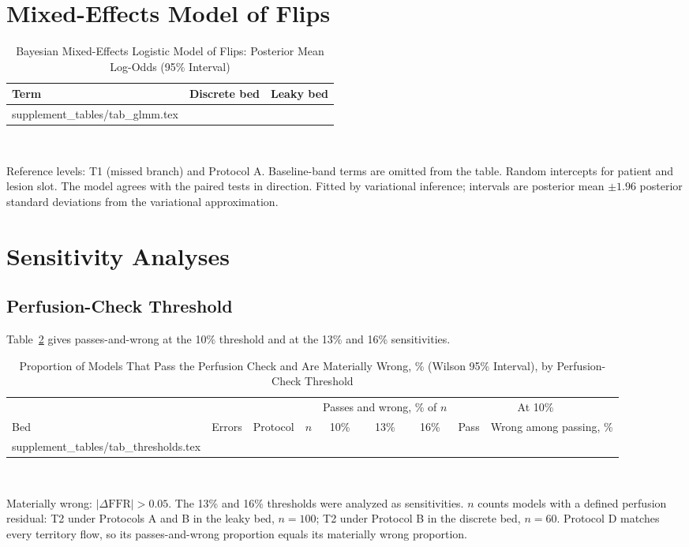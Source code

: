 \documentclass[journal,twoside,web,onecolumn]{ieeecolor}
\begin{document}
\FloatBarrier
{}
\section{Mixed-Effects Model of Flips}
\begin{table}[!ht]
\caption{Bayesian Mixed-Effects Logistic Model of Flips: Posterior Mean Log-Odds (95\% Interval)}\label{tab:glmm}
\centering\footnotesize
\begin{tabular}{@{}lcc@{}}
\toprule
Term & Discrete bed & Leaky bed\\
\midrule
{} supplement_tables/tab_glmm.tex 
\bottomrule
\end{tabular}
\\[3pt]
\parbox{0.85\textwidth}{\footnotesize Reference levels: T1 (missed branch) and Protocol A. Baseline-band terms are
omitted from the table. Random intercepts for patient and lesion slot. The model agrees with the paired tests in direction. Fitted by variational inference; intervals are
posterior mean $\pm 1.96$ posterior standard deviations from the variational approximation.}
\end{table}

\FloatBarrier
{}
\section{Sensitivity Analyses}
\subsection{Perfusion-Check Threshold}
Table~\ref{tab:thr} gives passes-and-wrong at the 10\% threshold and at the 13\% and 16\% sensitivities.
\begin{table}[!ht]
\caption{Proportion of Models That Pass the Perfusion Check and Are Materially Wrong, \% (Wilson 95\% Interval), by
Perfusion-Check Threshold}\label{tab:thr}
\centering\footnotesize
\begin{tabular}{@{}lllrcccrc@{}}
\toprule
 & & & & \multicolumn{3}{c}{Passes and wrong, \% of $n$} & \multicolumn{2}{c}{At 10\%}\\
\cmidrule(lr){5-7}\cmidrule(l){8-9}
Bed & Errors & Protocol & $n$ & 10\% & 13\% & 16\% & Pass & Wrong among passing, \%\\
\midrule
{} supplement_tables/tab_thresholds.tex 
\bottomrule
\end{tabular}
\\[3pt]
\parbox{0.85\textwidth}{\footnotesize Materially wrong: $|\Delta\mathrm{FFR}| > 0.05$. The 13\% and 16\% thresholds were analyzed as sensitivities. $n$ counts models with a
defined perfusion residual: T2 under Protocols A and B in the leaky bed, $n = 100$; T2 under Protocol B in the
discrete bed, $n = 60$. Protocol D matches every territory flow, so its passes-and-wrong proportion equals its
materially wrong proportion.}
\end{table}
\end{document}
